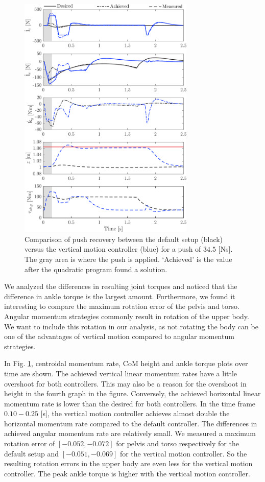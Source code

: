 \documentclass[letterpaper, 10 pt, conference]{ieeeconf}  %
\begin{document}
\begin{figure}[h]
      \centering
      \includegraphics[width=3.3in]{valcomparetime.png}
      \caption{Comparison of push recovery between the default setup (black) versus the vertical motion controller (blue) for a push of $34.5$ [Ns]. The gray area is where the push is applied. `Achieved' is the value after the quadratic program found a solution.}
      \label{fig:valcompare}
\end{figure}

We analyzed the differences in resulting joint torques and noticed that the difference in ankle torque is the largest amount. Furthermore, we found it interesting to compare the maximum rotation error of the pelvis and torso. Angular momentum strategies commonly result in rotation of the upper body. We want to include this rotation in our analysis, as not rotating the body can be one of the advantages of vertical motion compared to angular momentum strategies.

In Fig. \ref{fig:valcompare}, centroidal momentum rate, CoM height and ankle torque plots over time are shown. The achieved vertical linear momentum rates have a little overshoot for both controllers. This may also be a reason for the overshoot in height in the fourth graph in the figure. Conversely, the achieved horizontal linear momentum rate is lower than the desired for both controllers. In the time frame $0.10-0.25$ [s], the vertical motion controller achieves almost double the horizontal momentum rate compared to the default controller. The differences in achieved angular momentum rate are relatively small. We measured a maximum rotation error of $[-0.052,-0.072]$ for pelvis and torso respectively for the default setup and $[-0.051,-0.069]$ for the vertical motion controller. So the resulting rotation errors in the upper body are even less for the vertical motion controller. The peak ankle torque is higher with the vertical motion controller.
\end{document}

